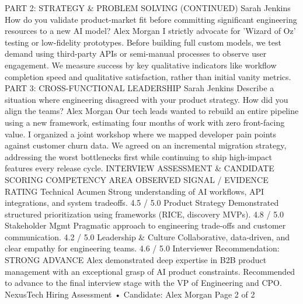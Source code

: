 \documentclass[12pt]{article}
\begin{document}
PART 2: STRATEGY \& PROBLEM SOLVING (CONTINUED)
Sarah Jenkins
How do you validate product-market fit before committing significant engineering resources to a new AI model?
Alex Morgan
I strictly advocate for 'Wizard of Oz' testing or low-fidelity prototypes. Before building full custom models, we test
demand using third-party APIs or semi-manual processes to observe user engagement. We measure success by key
qualitative indicators like workflow completion speed and qualitative satisfaction, rather than initial vanity metrics.
PART 3: CROSS-FUNCTIONAL LEADERSHIP
Sarah Jenkins
Describe a situation where engineering disagreed with your product strategy. How did you align the teams?
Alex Morgan
Our tech leads wanted to rebuild an entire pipeline using a new framework, estimating four months of work with zero
front-facing value. I organized a joint workshop where we mapped developer pain points against customer churn
data. We agreed on an incremental migration strategy, addressing the worst bottlenecks first while continuing to ship
high-impact features every release cycle.
INTERVIEW ASSESSMENT \& CANDIDATE SCORING
COMPETENCY AREA
OBSERVED SIGNAL / EVIDENCE
RATING
Technical Acumen
Strong understanding of AI workflows, API integrations, and system tradeoffs.
4.5 /
5.0
Product Strategy
Demonstrated structured prioritization using frameworks (RICE, discovery
MVPs).
4.8 /
5.0
Stakeholder Mgmt
Pragmatic approach to engineering trade-offs and customer communication.
4.2 /
5.0
Leadership \&
Culture
Collaborative, data-driven, and clear empathy for engineering teams.
4.6 /
5.0
Interviewer Recommendation: STRONG ADVANCE
Alex demonstrated deep expertise in B2B product management with an exceptional grasp of AI product
constraints. Recommended to advance to the final interview stage with the VP of Engineering and CPO.
NexusTech Hiring Assessment • Candidate: Alex Morgan
Page 2 of 2
\end{document}
